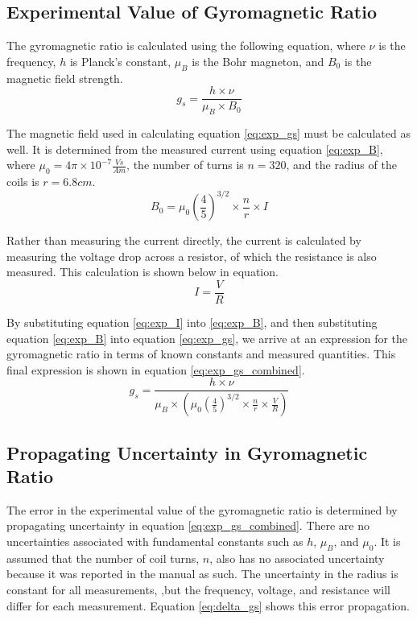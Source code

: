 \documentclass[a4paper]{article}
\begin{document}
\subsection{Experimental Value of Gyromagnetic Ratio}
\qq The gyromagnetic ratio is calculated using the following equation,
where $\nu$ is the frequency, $h$ is Planck's constant, $\mu_B$ is the
Bohr magneton, and $B_0$ is the magnetic field strength.
\begin{equation}
\label{eq:exp_gs}
g_s = \frac{h \times \nu}{\mu_B \times B_0}
\end{equation}

\qq The magnetic field used in calculating equation \ref{eq:exp_gs}
must be calculated as well. It is determined from the measured current
using equation \ref{eq:exp_B}, where $\mu_0 = 4 \pi \times 10^{-7}
\frac{Vs}{Am}$, the number of turns is $n=320$, and the radius of the
coils is $r=6.8cm$.
\begin{equation}
\label{eq:exp_B}
B_0 = \mu_0 \left( \frac{4}{5} \right) ^{3/2} \times \frac{n}{r} \times I
\end{equation}

\qq Rather than measuring the current directly, the current is
calculated by measuring the voltage drop across a resistor, of which
the resistance is also measured. This calculation is shown below in
equation.
\begin{equation}
\label{eq:exp_I}
I = \frac{V}{R}
\end{equation}

\qq By substituting equation \ref{eq:exp_I} into \ref{eq:exp_B}, and
then substituting equation \ref{eq:exp_B} into equation
\ref{eq:exp_gs}, we arrive at an expression for the gyromagnetic ratio
in terms of known constants and measured quantities. This final
expression is shown in equation \ref{eq:exp_gs_combined}.
\begin{equation}
\label{eq:exp_gs_combined}
g_s = \frac{h \times \nu}{\mu_B \times \left( \mu_0 \left( \frac{4}{5}
  \right) ^{3/2} \times \frac{n}{r} \times \frac{V}{R} \right) }
\end{equation}

\subsection{Propagating Uncertainty in Gyromagnetic Ratio}
\qq The error in the experimental value of the gyromagnetic ratio is
determined by propagating uncertainty in equation
\ref{eq:exp_gs_combined}. There are no uncertainties associated with
fundamental constants such as $h$, $\mu_B$, and $\mu_0$. It is assumed
that the number of coil turns, $n$, also has no associated uncertainty
because it was reported in the manual as such. The uncertainty in the
radius is constant for all measurements, ,but the frequency, voltage,
and resistance will differ for each measurement. Equation
\ref{eq:delta_gs} shows this error propagation.
\end{document}
